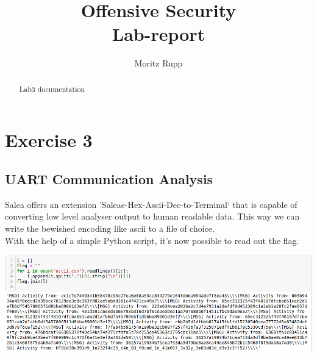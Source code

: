 \documentclass[a4paper,10pt]{article}
\title{Offensive Security\\
	Lab-report
}
\author{Moritz Rupp}
\begin{document}
\maketitle
\tableofcontents
\begin{abstract}
Lab3 documentation
\end{abstract}
\newpage
\section{Exercise 3}
\subsection{UART Communication Analysis}
Salea offers an extension 'Saleae-Hex-Ascii-Dec-to-Terminal` that is capable of converting low level analyser output to human readable data. This way we can write the bewished encoding like ascii to a file of choice.\\
With the help of a simple Python script, it's now possible to read out the flag.
\begin{center}
 \includegraphics[scale=0.4]{3.1.png}
\end{center}
\end{document}
